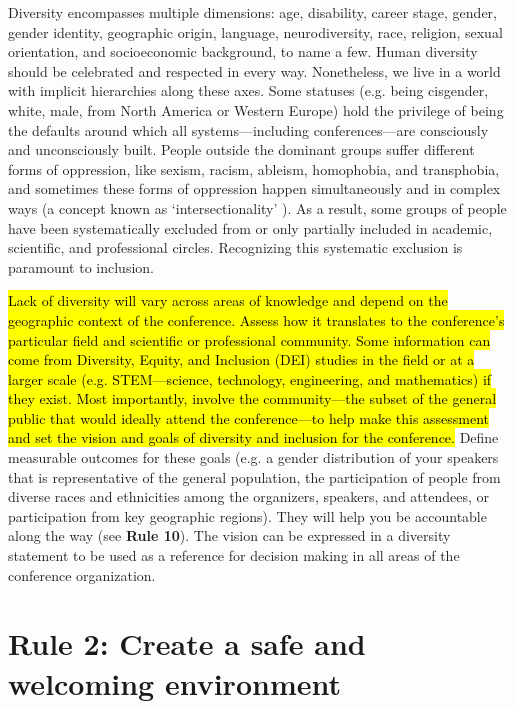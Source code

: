 \documentclass[10pt,letterpaper]{article}
\begin{document}
Diversity encompasses multiple dimensions: age, disability, career stage, gender, gender identity, geographic origin, language, neurodiversity, race, religion, sexual orientation, and socioeconomic background, to name a few.
Human diversity should be celebrated and respected in every way. 
Nonetheless, we live in a world with implicit hierarchies along these axes. 
Some statuses (e.g. being cisgender, white, male, from North America or Western Europe) hold the privilege of being the defaults around which all systems—including conferences—are consciously and unconsciously built. 
People outside the dominant groups suffer different forms of oppression, like sexism, racism, ableism, homophobia, and transphobia, and sometimes these forms of oppression happen simultaneously and in complex ways (a concept known as `intersectionality' \cite{crenshawDemarginalizingIntersectionRace1989}).
As a result, some groups of people have been systematically excluded from or only partially included in academic, scientific, and professional circles.
Recognizing this systematic exclusion is paramount to inclusion.

\hl{
Lack of diversity will vary across areas of knowledge and depend on the geographic context of the conference.
Assess how it translates to the conference's particular field and scientific or professional community.
Some information can come from Diversity, Equity, and Inclusion (DEI) studies in the field or at a larger scale (e.g. STEM---science, technology, engineering, and mathematics) if they exist. 
Most importantly, involve the community---the subset of the general public that would ideally attend the conference---to help make this assessment and set the vision and goals of diversity and inclusion for the conference.} 
Define measurable outcomes for these goals (e.g. a gender distribution of your speakers that is representative of the general population, the participation of people from diverse races and ethnicities among the organizers, speakers, and attendees, or participation from key geographic regions). 
They will help you be accountable along the way (see \textbf{Rule 10}).  %
The vision can be expressed in a diversity statement to be used as a reference for decision making in all areas of the conference organization.

\section*{Rule 2: Create a safe and welcoming environment}
\label{rule_inclusion}
\end{document}

